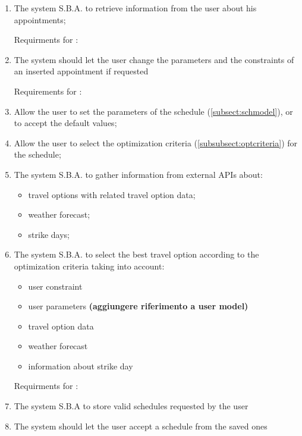 \begin{enumerate}
\renewcommand\labelenumi{\textbf{R\theenumi}}

\item The system S.B.A. to retrieve information from the user about his appointments; \label{req:R1}

Requirments for :

\item The system should let the user change the parameters and the constraints of an inserted appointment if requested 

Requirements for :

\item Allow the user to set the parameters of the schedule (\ref{subsect:schmodel}), or to accept the default values;
 
\item Allow the user to select the optimization criteria (\ref{subsubsect:optcriteria}) for the schedule;

\item The system S.B.A. to gather information from external APIs about: 
\begin{itemize}
\item travel options with related travel option data;
\item weather forecast;
\item strike days;
\end{itemize}

\item The system S.B.A. to select the best travel option according to the optimization criteria taking into account:
\begin{itemize}
\item user constraint
\item user parameters \textbf{(aggiungere riferimento a user model)}
\item travel option data 
\item weather forecast
\item information about strike day
\end{itemize}

Requirments for :

\item The system S.B.A to store valid schedules requested by the user

\item The system should let the user accept a schedule from the saved ones 


\end{enumerate}
